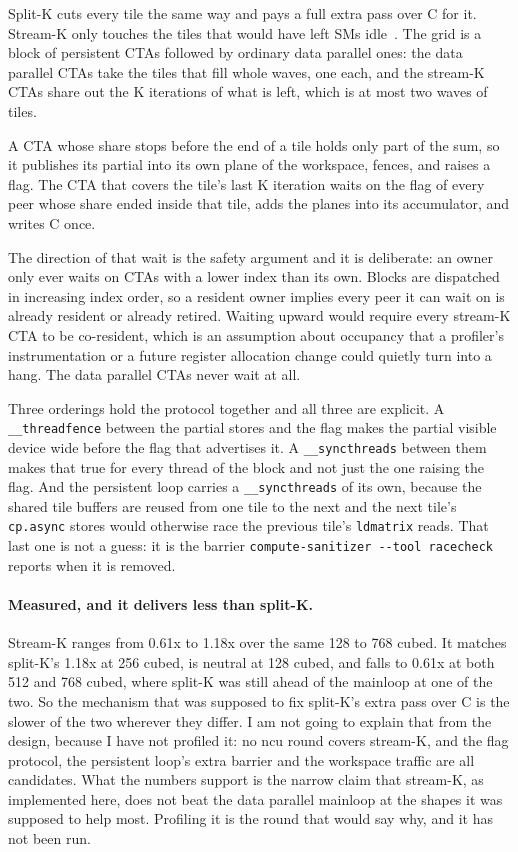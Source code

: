 Split-K cuts every tile the same way and pays a full extra pass over C for it.
Stream-K only touches the tiles that would have left SMs idle~\cite{osama2023}.
The grid is a block of persistent CTAs followed by ordinary data parallel ones:
the data parallel CTAs take the tiles that fill whole waves, one each, and the
stream-K CTAs share out the K iterations of what is left, which is at most two
waves of tiles.

A CTA whose share stops before the end of a tile holds only part of the sum, so it
publishes its partial into its own plane of the workspace, fences, and raises a
flag. The CTA that covers the tile's last K iteration waits on the flag of every
peer whose share ended inside that tile, adds the planes into its accumulator, and
writes C once.

The direction of that wait is the safety argument and it is deliberate: an owner
only ever waits on CTAs with a lower index than its own. Blocks are dispatched in
increasing index order, so a resident owner implies every peer it can wait on is
already resident or already retired. Waiting upward would require every stream-K
CTA to be co-resident, which is an assumption about occupancy that a profiler's
instrumentation or a future register allocation change could quietly turn into a
hang. The data parallel CTAs never wait at all.

Three orderings hold the protocol together and all three are explicit. A
\texttt{\_\_threadfence} between the partial stores and the flag makes the partial
visible device wide before the flag that advertises it. A
\texttt{\_\_syncthreads} between them makes that true for every thread of the
block and not just the one raising the flag. And the persistent loop carries a
\texttt{\_\_syncthreads} of its own, because the shared tile buffers are reused
from one tile to the next and the next tile's \texttt{cp.async} stores would
otherwise race the previous tile's \texttt{ldmatrix} reads. That last one is not a
guess: it is the barrier \texttt{compute-sanitizer -{}-tool racecheck} reports when
it is removed.

\paragraph{Measured, and it delivers less than split-K.} Stream-K ranges from 0.61x
to 1.18x over the same 128 to 768 cubed. It matches split-K's 1.18x at 256 cubed,
is neutral at 128 cubed, and falls to 0.61x at both 512 and 768 cubed, where
split-K was still ahead of the mainloop at one of the two. So the mechanism that
was supposed to fix split-K's extra pass over C is the slower of the two wherever
they differ. I am not going to explain that from the design, because I have not
profiled it: no ncu round covers stream-K, and the flag protocol, the persistent
loop's extra barrier and the workspace traffic are all candidates. What the numbers
support is the narrow claim that stream-K, as implemented here, does not beat the
data parallel mainloop at the shapes it was supposed to help most. Profiling it is
the round that would say why, and it has not been run.

